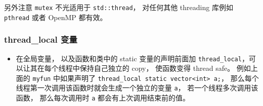 另外注意 \verb|mutex| 不光适用于 \verb|std::thread|， 对任何其他 threading 库例如 \verb|pthread| 或者 OpenMP 都有效。


\subsubsection{thread\_local 变量}
\begin{itemize}
\item 在全局变量， 以及函数和类中的 static 变量的声明前面加 \verb|thread_local|，可以让其在每个线程中保持自己独立的 copy， 使函数变得 thread safe。 例如上面的 \verb|myfun| 中如果声明了 \verb|thread_local static vector<int> a;|， 那么每个线程第一次调用该函数时就会生成一个独立的变量 \verb|a|， 若一个线程多次调用该函数， 那么每次调用时 \verb|a| 都会有上次调用结束前的值。
\end{itemize}

